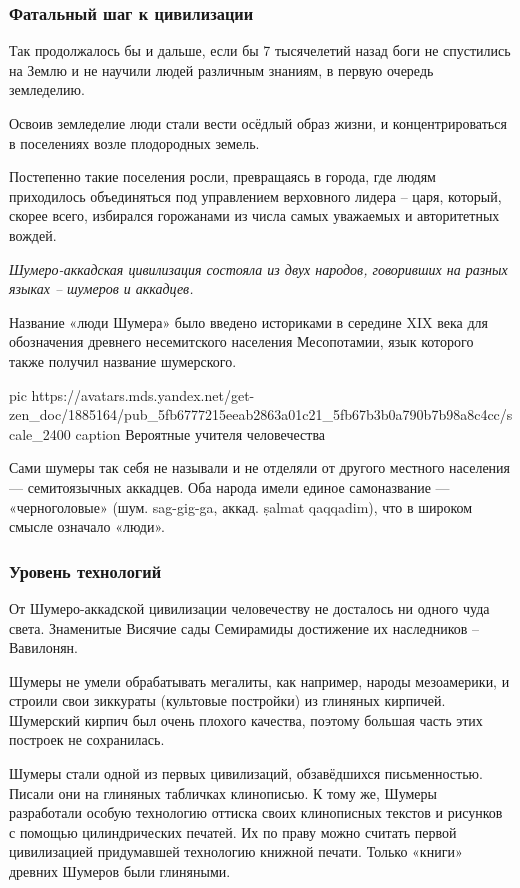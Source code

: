 \subsubsection{Фатальный шаг к цивилизации}

Так продолжалось бы и дальше, если бы 7 тысячелетий назад боги не спустились на
Землю и не научили людей различным знаниям, в первую очередь земледелию.

Освоив земледелие люди стали вести осёдлый образ жизни, и концентрироваться в
поселениях возле плодородных земель.

Постепенно такие поселения росли, превращаясь в города, где людям приходилось
объединяться под управлением верховного лидера – царя, который, скорее всего,
избирался горожанами из числа самых уважаемых и авторитетных вождей.

\begin{leftbar}
	\begingroup
		\em Шумеро-аккадская цивилизация состояла из двух народов, говоривших на
				разных языках – шумеров и аккадцев.
	\endgroup
\end{leftbar}

Название «люди Шумера» было введено историками в середине XIX века для
обозначения древнего несемитского населения Месопотамии, язык которого также
получил название шумерского. 

\ifcmt
pic https://avatars.mds.yandex.net/get-zen_doc/1885164/pub_5fb6777215eeab2863a01c21_5fb67b3b0a790b7b98a8c4cc/scale_2400
caption Вероятные учителя человечества
\fi

Сами шумеры так себя не называли и не отделяли от другого местного населения —
семитоязычных аккадцев. Оба народа имели единое самоназвание — «черноголовые»
(шум. sag-gig-ga, аккад. ṣalmat qaqqadim), что в широком смысле означало
«люди».

\subsubsection{Уровень технологий}

От Шумеро-аккадской цивилизации человечеству не досталось ни одного чуда света.
Знаменитые Висячие сады Семирамиды достижение их наследников – Вавилонян.

Шумеры не умели обрабатывать мегалиты, как например, народы мезоамерики, и
строили свои зиккураты (культовые постройки) из глиняных кирпичей. Шумерский
кирпич был очень плохого качества, поэтому большая часть этих построек не
сохранилась.

Шумеры стали одной из первых цивилизаций, обзавёдшихся письменностью. Писали
они на глиняных табличках клинописью. К тому же, Шумеры разработали особую
технологию оттиска своих клинописных текстов и рисунков с помощью
цилиндрических печатей. Их по праву можно считать первой цивилизацией
придумавшей технологию книжной печати. Только «книги» древних Шумеров были
глиняными.

